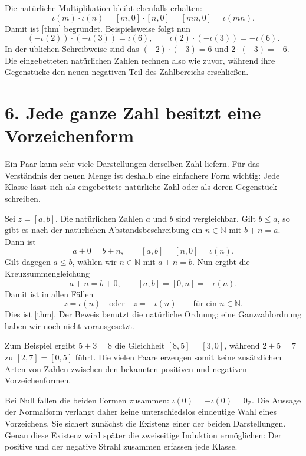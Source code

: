 Die natürliche Multiplikation bleibt ebenfalls erhalten:
\[
  \iota(m)\cdot\iota(n)
    =[m,0]\cdot[n,0]
    =[mn,0]
    =\iota(mn).
\]
Damit ist [thm]
begründet. Beispielsweise folgt nun
\[
  (-\iota(2))\cdot(-\iota(3))=\iota(6),
  \qquad
  \iota(2)\cdot(-\iota(3))=-\iota(6).
\]
In der üblichen Schreibweise sind das \((-2)\cdot(-3)=6\) und
\(2\cdot(-3)=-6\). Die eingebetteten natürlichen Zahlen rechnen
also wie zuvor, während ihre Gegenstücke den neuen negativen Teil
des Zahlbereichs erschließen.

\par{}
\hypertarget{integers.reading.normalforms}{}
\section*{6. Jede ganze Zahl besitzt eine Vorzeichenform}

Ein Paar kann sehr viele Darstellungen derselben Zahl liefern. Für
das Verständnis der neuen Menge ist deshalb eine einfachere Form
wichtig: Jede Klasse lässt sich als eingebettete natürliche Zahl
oder als deren Gegenstück schreiben.

Sei \(z=[a,b]\). Die natürlichen Zahlen \(a\) und \(b\) sind
vergleichbar. Gilt \(b\leq a\), so gibt es nach der natürlichen
Abstandsbeschreibung ein \(n\in\mathbb N\) mit \(b+n=a\).
Dann ist
\[
  a+0=b+n,
  \qquad [a,b]=[n,0]=\iota(n).
\]
Gilt dagegen \(a\leq b\), wählen wir \(n\in\mathbb N\) mit
\(a+n=b\). Nun ergibt die Kreuzsummengleichung
\[
  a+n=b+0,
  \qquad [a,b]=[0,n]=-\iota(n).
\]
Damit ist in allen Fällen
\[
  z=\iota(n)\quad\text{oder}\quad z=-\iota(n)
  \qquad\text{für ein }n\in\mathbb N.
\]
Dies ist [thm]. Der Beweis
benutzt die natürliche Ordnung; eine Ganzzahlordnung haben wir
noch nicht vorausgesetzt.

Zum Beispiel ergibt \(5+3=8\) die Gleichheit
\([8,5]=[3,0]\), während \(2+5=7\) zu
\([2,7]=[0,5]\) führt. Die vielen Paare erzeugen somit keine
zusätzlichen Arten von Zahlen zwischen den bekannten positiven und
negativen Vorzeichenformen.

Bei Null fallen die beiden Formen zusammen:
\(\iota(0)=-\iota(0)=0_{\mathbb Z}\).
Die Aussage der Normalform verlangt daher keine unterschiedslos
eindeutige Wahl eines Vorzeichens. Sie sichert zunächst die
Existenz einer der beiden Darstellungen. Genau diese Existenz wird
später die zweiseitige Induktion ermöglichen: Der positive und der
negative Strahl zusammen erfassen jede Klasse.

